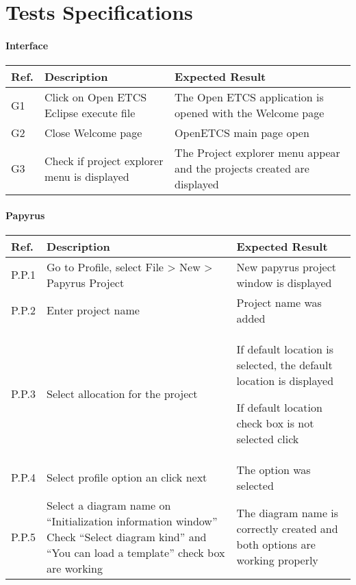 \section{Tests Specifications}
\label{sec:test_specification}


\paragraph{Interface}

\begin{center}
\begin{longtable}{|p{1cm}|p{6cm}|p{6cm}|}\hline
\textbf{Ref.} & \textbf{Description} & \textbf{Expected Result} \\\hline
G1 & Click on Open ETCS Eclipse execute file & The Open ETCS application is opened with the Welcome page \\\hline
G2 & Close Welcome page & OpenETCS main page open\\\hline
G3 & Check if project explorer menu is displayed & The Project explorer menu appear and the projects created are displayed\\\hline
\end{longtable}
\end{center}

\paragraph{Papyrus}

\begin{center}
\begin{longtable}{|p{1cm}|p{6cm}|p{6cm}|}\hline
\textbf{Ref.} & \textbf{Description} & \textbf{Expected Result} \\\hline
P.P.1 & Go to Profile, select File > New > Papyrus Project & New papyrus project window is displayed \\\hline
P.P.2 & Enter project name & Project name was added\\\hline
P.P.3 & Select  allocation for the project & If default location is selected, the default location is displayed

If default location check box is not selected click\\\hline
P.P.4 & Select profile option an click next & The option was selected\\\hline
P.P.5 & Select a diagram name on “Initialization information window”
Check “Select diagram kind” and “You can load a template” check box are working
 & The diagram name is correctly created and both options are working properly\\\hline
\end{longtable}
\end{center}

